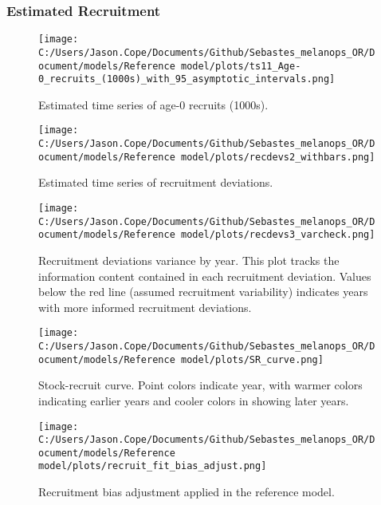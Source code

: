 \documentclass[11pt,
  english,
  letterpaper,
]{article}
\begin{document}
\newpage

\hypertarget{estimated-recruitment}{%
\subsubsection{Estimated Recruitment}\label{estimated-recruitment}}

\begin{figure}
\centering
\texttt{[image: C:/Users/Jason.Cope/Documents/Github/Sebastes\_melanops\_OR/Document/models/Reference model/plots/ts11\_Age-0\_recruits\_(1000s)\_with\_95\_asymptotic\_intervals.png]}
\caption{Estimated time series of age-0 recruits (1000s).\label{fig:recruits}}
\end{figure}

\newpage

\begin{figure}
\centering
\texttt{[image: C:/Users/Jason.Cope/Documents/Github/Sebastes\_melanops\_OR/Document/models/Reference model/plots/recdevs2\_withbars.png]}
\caption{Estimated time series of recruitment deviations.\label{fig:rec-devs}}
\end{figure}

\newpage

\begin{figure}
\centering
\texttt{[image: C:/Users/Jason.Cope/Documents/Github/Sebastes\_melanops\_OR/Document/models/Reference model/plots/recdevs3\_varcheck.png]}
\caption{Recruitment deviations variance by year. This plot tracks the information content contained in each recruitment deviation. Values below the red line (assumed recruitment variability) indicates years with more informed recruitment deviations.\label{fig:rec-devs-sigmas}}
\end{figure}

\newpage

\begin{figure}
\centering
\texttt{[image: C:/Users/Jason.Cope/Documents/Github/Sebastes\_melanops\_OR/Document/models/Reference model/plots/SR\_curve.png]}
\caption{Stock-recruit curve. Point colors indicate year, with warmer colors indicating earlier years and cooler colors in showing later years.\label{fig:bh-curve}}
\end{figure}

\newpage

\begin{figure}
\centering
\texttt{[image: C:/Users/Jason.Cope/Documents/Github/Sebastes\_melanops\_OR/Document/models/Reference model/plots/recruit\_fit\_bias\_adjust.png]}
\caption{Recruitment bias adjustment applied in the reference model.\label{fig:bias-adj}}
\end{figure}
\end{document}
